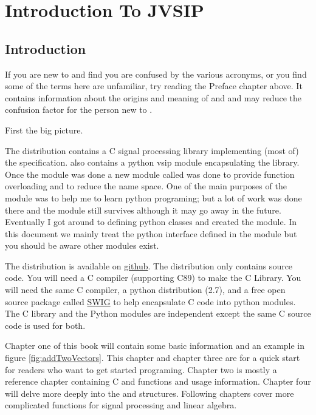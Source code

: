 \chapter{Introduction To JVSIP}
\section*{Introduction}
If you are new to  and find you are confused by the various acronyms, or you find some of the terms here are unfamiliar, try reading the Preface chapter above. It contains information about the origins and meaning of \jv{} and  and may reduce the confusion factor for the person new to .

First the big picture.

The \jv{} distribution contains a C signal processing library implementing (most of) the  specification. \jv{} also contains a python vsip module encapsulating the  library.  Once the {} module was done a new module called {} was done to provide function overloading and to reduce the name space.  One of the main purposes of the {} module was to help me to learn python programing; but a lot of work was done there and the module still survives although it may go away in the future.  Eventually I got around to defining python classes and created the \pyjv{} module.  In this document we mainly treat the python interface defined in the \pyjv{} module but you should be aware other modules exist.

The distribution is available on \href{https://github.com/rrjudd/jvsip?}{{github}}. The distribution only contains source code. You will need a C compiler (supporting C89) to make the C Library. You will need the same C compiler, a python distribution (2.7), and a free open source package called \href{http://www.swig.org}{SWIG} to help encapsulate C code into python modules. The C library and the Python modules are independent except the same C source code is used for both.

Chapter one of this book will contain some basic information and an example in figure \ref{fig:addTwoVectors}. This chapter and chapter three are for a quick start for readers who want to get started programing. Chapter two is mostly a reference chapter containing C and \pyjv{} functions and usage information.  Chapter four will delve more deeply into the  and  structures.  Following chapters cover more complicated functions for signal processing and linear algebra.

